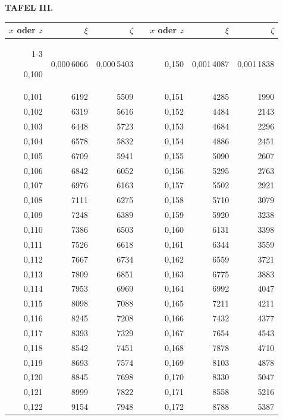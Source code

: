 \endgroup
\clearpage
{}
\begingroup
\centering
\fontsize{9}{9}\selectfont
\setlength{\tabcolsep}{8pt}
\renewcommand{\arraystretch}{1}
\setlength{\parskip}{0pt}
\textbf{TAFEL III.}
\par\vspace{7pt}
\begin{tabular}{|r|r|r|@{}p{9pt}@{}|r|r|r|}
\hline
\rule{0pt}{8.5pt}\(x\) oder \(z\) & \(\xi\) & \(\zeta\) & & \(x\) oder \(z\) & \(\xi\) & \(\zeta\) \\
\cline{1-3}\cline{5-7}
\rule{0pt}{8.5pt}0,100 & 0,000\,6066 & 0,000\,5403 &  & 0,150 & 0,001\,4087 & 0,001\,1838 \\
0,101 & 6192 & 5509 &  & 0,151 & 4285 & 1990 \\
0,102 & 6319 & 5616 &  & 0,152 & 4484 & 2143 \\
0,103 & 6448 & 5723 &  & 0,153 & 4684 & 2296 \\
0,104 & 6578 & 5832 &  & 0,154 & 4886 & 2451 \\
0,105 & 6709 & 5941 &  & 0,155 & 5090 & 2607 \\[3pt]
0,106 & 6842 & 6052 &  & 0,156 & 5295 & 2763 \\
0,107 & 6976 & 6163 &  & 0,157 & 5502 & 2921 \\
0,108 & 7111 & 6275 &  & 0,158 & 5710 & 3079 \\
0,109 & 7248 & 6389 &  & 0,159 & 5920 & 3238 \\
0,110 & 7386 & 6503 &  & 0,160 & 6131 & 3398 \\[3pt]
0,111 & 7526 & 6618 &  & 0,161 & 6344 & 3559 \\
0,112 & 7667 & 6734 &  & 0,162 & 6559 & 3721 \\
0,113 & 7809 & 6851 &  & 0,163 & 6775 & 3883 \\
0,114 & 7953 & 6969 &  & 0,164 & 6992 & 4047 \\
0,115 & 8098 & 7088 &  & 0,165 & 7211 & 4211 \\[3pt]
0,116 & 8245 & 7208 &  & 0,166 & 7432 & 4377 \\
0,117 & 8393 & 7329 &  & 0,167 & 7654 & 4543 \\
0,118 & 8542 & 7451 &  & 0,168 & 7878 & 4710 \\
0,119 & 8693 & 7574 &  & 0,169 & 8103 & 4878 \\
0,120 & 8845 & 7698 &  & 0,170 & 8330 & 5047 \\[3pt]
0,121 & 8999 & 7822 &  & 0,171 & 8558 & 5216 \\
0,122 & 9154 & 7948 &  & 0,172 & 8788 & 5387 \\

\end{tabular}
